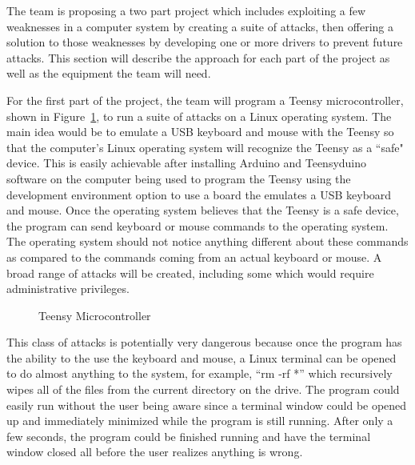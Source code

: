 \documentclass{ieee}
\begin{document}
The team is proposing a two part project which includes exploiting a few weaknesses in a computer system by creating a suite of attacks, then offering a solution to those weaknesses by developing one or more drivers to prevent future attacks. This section will describe the approach for each part of the project as well as the equipment the team will need.

For the first part of the project, the team will program a Teensy microcontroller, shown in Figure~\ref{fig:Teensy}, to run a suite of attacks on a Linux operating system. The main idea would be to emulate a USB keyboard and mouse with the Teensy so that the computer's Linux operating system will recognize the Teensy as a ``safe" device. This is easily achievable after installing Arduino and Teensyduino software on the computer being used to program the Teensy using the development environment option to use a board the emulates a USB keyboard and mouse. Once the operating system believes that the Teensy is a safe device, the program can send keyboard or mouse commands to the operating system. The operating system should not notice anything different about these commands as compared to the commands coming from an actual keyboard or mouse. A broad range of attacks will be created, including some which would require administrative privileges.

\begin{figure}[H]
   \caption{Teensy Microcontroller}
   \label{fig:Teensy}
\end{figure}

This class of attacks is potentially very dangerous because once the program has the ability to the use the keyboard and mouse, a Linux terminal can be opened to do almost anything to the system, for example, ``rm -rf *'' which recursively wipes all of the files from the current directory on the drive. The program could easily run without the user being aware since a terminal window could be opened up and immediately minimized while the program is still running. After only a few seconds, the program could be finished running and have the terminal window closed all before the user realizes anything is wrong.
\end{document}
